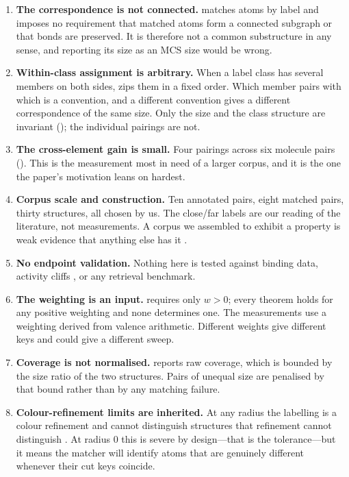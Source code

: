 \documentclass[11pt,twocolumn,a4paper]{article}
\theoremstyle{scthm}
\theoremstyle{definition}
\theoremstyle{remark}
\newcommand{\wt}{w}
\begin{document}
\begin{enumerate}[label=\textbf{L\arabic*.},leftmargin=2.8em,itemsep=4pt]

\item \textbf{The correspondence is not connected.} 
matches atoms by label and imposes no requirement that matched atoms form
a connected subgraph or that bonds are preserved. It is therefore not a
common substructure in any sense, and reporting its size as an MCS size
would be wrong.

\item \textbf{Within-class assignment is arbitrary.} When a label class
has several members on both sides,  zips them in a fixed
order. Which member pairs with which is a convention, and a different
convention gives a different correspondence of the same size. Only the
size and the class structure are invariant (); the
individual pairings are not.

\item \textbf{The cross-element gain is small.} Four pairings across six
molecule pairs (). This is the measurement most in need of
a larger corpus, and it is the one the paper's motivation leans on hardest.

\item \textbf{Corpus scale and construction.} Ten annotated pairs, eight
matched pairs, thirty structures, all chosen by us. The
\textsf{close}/\textsf{far} labels are our reading of the literature, not
measurements. A corpus we assembled to exhibit a property is weak evidence
that anything else has it \citep{ioannidis2005}.

\item \textbf{No endpoint validation.} Nothing here is tested against
binding data, activity cliffs \citep{stumpfe2012}, or any retrieval
benchmark.

\item \textbf{The weighting is an input.}  requires only
$\wt>0$; every theorem holds for any positive weighting and none
determines one. The measurements use a weighting derived from valence
arithmetic. Different weights give different keys and could give a
different sweep.

\item \textbf{Coverage is not normalised.}  reports raw
coverage, which is bounded by the size ratio of the two structures. Pairs
of unequal size are penalised by that bound rather than by any matching
failure.

\item \textbf{Colour-refinement limits are inherited.} At any radius the
labelling is a colour refinement and cannot distinguish structures that
refinement cannot distinguish \citep{arvind2015}. At radius $0$ this is
severe by design---that is the tolerance---but it means the matcher will
identify atoms that are genuinely different whenever their cut keys
coincide.
\end{enumerate}
\end{document}
